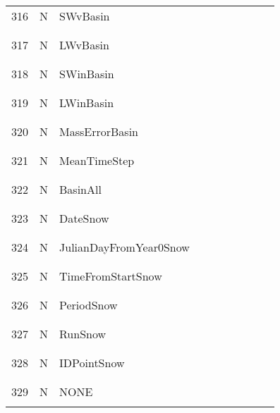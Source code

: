 \begin{longtable}{|c|c|l|c|c|c|c|p{}|c|p{}|}
316 & N & SWvBasin & & & & & & & \\
&&&&&&&&&\\\hline%
&&&&&&&&&\\
317 & N & LWvBasin & & & & & & & \\
&&&&&&&&&\\\hline%
&&&&&&&&&\\
318 & N & SWinBasin & & & & & & & \\
&&&&&&&&&\\\hline%
&&&&&&&&&\\
319 & N & LWinBasin & & & & & & & \\
&&&&&&&&&\\\hline%
&&&&&&&&&\\
320 & N & MassErrorBasin & & & & & & & \\
&&&&&&&&&\\\hline%
&&&&&&&&&\\
321 & N & MeanTimeStep & & & & & & & \\
&&&&&&&&&\\\hline%
&&&&&&&&&\\
322 & N & BasinAll & & & & & & & \\
&&&&&&&&&\\\hline%
&&&&&&&&&\\
323 & N & DateSnow & & & & & & & \\
&&&&&&&&&\\\hline%
&&&&&&&&&\\
324 & N & JulianDayFromYear0Snow & & & & & & & \\
&&&&&&&&&\\\hline%
&&&&&&&&&\\
325 & N & TimeFromStartSnow & & & & & & & \\
&&&&&&&&&\\\hline%
&&&&&&&&&\\
326 & N & PeriodSnow & & & & & & & \\
&&&&&&&&&\\\hline%
&&&&&&&&&\\
327 & N & RunSnow & & & & & & & \\
&&&&&&&&&\\\hline%
&&&&&&&&&\\
328 & N & IDPointSnow & & & & & & & \\
&&&&&&&&&\\\hline%
&&&&&&&&&\\
329 & N & NONE & & & & & & & \\
&&&&&&&&&\\\hline%

\end{longtable}
